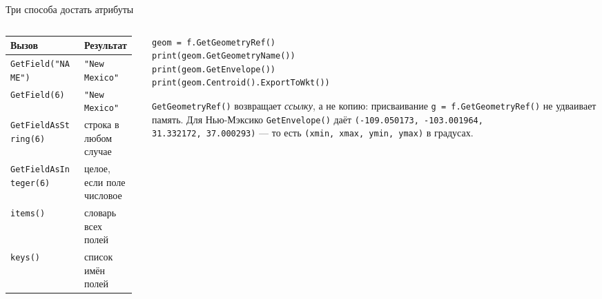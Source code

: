 \documentclass[aspectratio=169,10pt]{beamer}
\begin{document}
\begin{frame}[fragile]{Три способа достать атрибуты}
\footnotesize
\begin{columns}[T,onlytextwidth]
  \begin{column}{0.5\textwidth}
    \begin{tabular}{@{}p{0.56\linewidth}p{0.4\linewidth}@{}}
      \toprule
      Вызов & Результат \\
      \midrule
      \texttt{GetField("NAME")}      & \texttt{"New Mexico"} \\
      \texttt{GetField(6)}          & \texttt{"New Mexico"} \\
      \texttt{GetFieldAsString(6)}  & строка в любом случае \\
      \texttt{GetFieldAsInteger(6)} & целое, если поле числовое \\
      \texttt{items()}              & словарь всех полей \\
      \texttt{keys()}                & список имён полей \\
      \bottomrule
    \end{tabular}
  \end{column}
  \begin{column}{0.48\textwidth}
    \begin{Verbatim}[fontsize=\scriptsize]
geom = f.GetGeometryRef()
print(geom.GetGeometryName())
print(geom.GetEnvelope())
print(geom.Centroid().ExportToWkt())
\end{Verbatim}
    \vspace{0.2em}
    {\scriptsize \texttt{GetGeometryRef()} возвращает \emph{ссылку},
    а не копию: присваивание \texttt{g = f.GetGeometryRef()} не удваивает
    память.}
    \vspace{0.3em}
    {\scriptsize Для Нью-Мэксико \texttt{GetEnvelope()} даёт
     \texttt{(-109.050173, -103.001964,}\\
     \texttt{31.332172, 37.000293)} --- то есть
     \texttt{(xmin, xmax, ymin, ymax)} в градусах.}
  \end{column}
\end{columns}
\end{frame}
\end{document}
